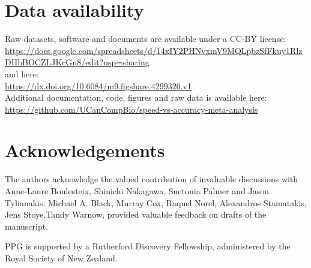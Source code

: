 \documentclass[fleqn,10pt]{SelfArx} %
\begin{document}
\section*{Data availability}
Raw datasets, software and documents are available under a CC-BY license:\\
\fussy
\url{https://docs.google.com/spreadsheets/d/14xIY2PHNvxmV9MQLpbzSfFkuy1RlzDHbBOCZLJKcGu8/edit?usp=sharing}\\
and here:\\
\fussy
\url{https://dx.doi.org/10.6084/m9.figshare.4299320.v1}\\
\sloppy
Additional documentation, code, figures and raw data is available here:\\
\fussy
\url{https://github.com/UCanCompBio/speed-vs-accuracy-meta-analysis}
\sloppy

\section*{Acknowledgements}

The authors acknowledge the valued contribution of invaluable
discussions with Anne-Laure Boulesteix, Shinichi Nakagawa, Suetonia
Palmer and Jason Tylianakis. Michael A. Black, Murray Cox, Raquel
Norel, Alexandros Stamatakis, Jens Stoye,Tandy Warnow, provided
valuable feedback on drafts of the manuscript.

PPG is supported by a Rutherford Discovery Fellowship,
administered by the Royal Society of New Zealand. 



\end{document}
